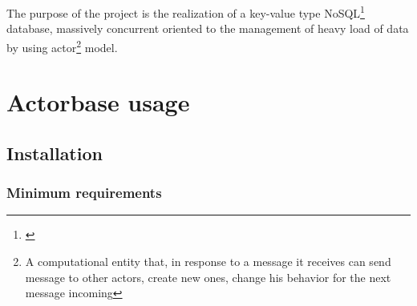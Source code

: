 \documentclass{scalatekids-article}
\begin{document}
The purpose of the project is the realization of a key-value type
NoSQL\footnote{\label{nosql}} database, massively concurrent oriented to the
management of heavy load of data by using actor\footnote{A computational entity
that, in response to a message it receives can send message to other actors,
create new ones, change his behavior for the next message incoming\label{actor}}
model.











\section{Actorbase usage}

\subsection{Installation}

\subsubsection{Minimum requirements}
\end{document}
